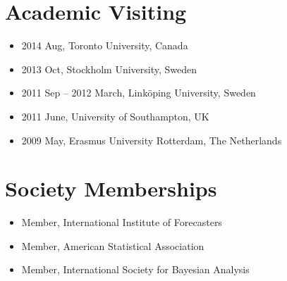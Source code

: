 \documentclass[twoside,a4paper]{article}
\begin{document}
\section{Academic Visiting}

\begin{itemize}
\item 2014 Aug, Toronto University, Canada
\item 2013 Oct, Stockholm University, Sweden
\item 2011 Sep – 2012 March, Linköping University, Sweden
\item 2011 June, University of Southampton, UK
\item 2009 May, Erasmus University Rotterdam, The Netherlands
\end{itemize}

\section{Society Memberships}

\begin{itemize}
\item Member, International Institute of Forecasters
\item Member, American Statistical Association
\item Member, International Society for Bayesian Analysis
\end{itemize}





\end{document}
